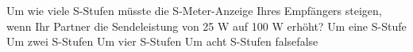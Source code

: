     {Um wie viele S-Stufen müsste die S-Meter-Anzeige Ihres Empfängers steigen, wenn Ihr Partner die Sendeleistung von 25 W auf 100 W erhöht?}
    {Um eine S-Stufe}
    {Um zwei S-Stufen}
    {Um vier S-Stufen}
    {Um acht S-Stufen}
    {false}{false}